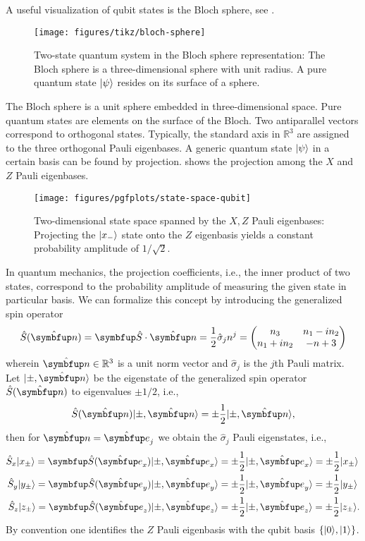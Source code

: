 A useful visualization of qubit states is the Bloch sphere, see .
\begin{figure}[htb]
	\centering
	\texttt{[image: figures/tikz/bloch-sphere]}
	\caption{Two-state quantum system in the Bloch sphere representation: The Bloch sphere is a three-dimensional sphere with unit radius. A pure quantum state  $\lvert\psi\rangle$ resides on its surface of a sphere.}\label{fig:bloch_sphere}
\end{figure}
The Bloch sphere is a unit sphere embedded in three-dimensional space.
Pure quantum states are elements on the surface of the Bloch.
Two antiparallel vectors correspond to orthogonal states.
Typically, the standard axis in $\mathbb{R}^3$ are assigned to the three orthogonal Pauli eigenbases.
A generic quantum state $\lvert\psi\rangle$ in a certain basis can be found by projection.
 shows the projection among the $X$ and $Z$ Pauli eigenbases.
\begin{figure}[htb]
	\centering
	\texttt{[image: figures/pgfplots/state-space-qubit]}
	\caption{Two-dimensional state space spanned by the $X,Z$ Pauli eigenbases: Projecting the $\lvert x_-\rangle$ state onto the $Z$ eigenbasis yields a constant probability amplitude of $1/\sqrt{2}$.}\label{fig:state_space_qubit}
\end{figure}
In quantum mechanics, the projection coefficients, i.e., the inner product of two states, correspond to the probability amplitude of measuring the given state in particular basis.
We can formalize this concept by introducing the generalized spin operator
\begin{equation}
	\hat{S}(\vu{n})
	=
	\vb{\hat{S}}\vdot\vu{n}
	=
	\frac{1}{2}
	\hat{\sigma}_jn^j
	=
	\begin{pmatrix}
		n_3 & n_1 - in_2 \\
		n_1 + in_2 & -n+3
	\end{pmatrix}
\end{equation}
wherein $\vu{n}\in\mathbb{R}^3$ is a unit norm vector and $\hat{\sigma}_j$ is the $j$th Pauli matrix.
Let $\ket{\pm,\vu{n}}$ be the eigenstate of the generalized spin operator $\hat{S}(\vu{n})$ to eigenvalues $\pm1/2$, i.e.,
\begin{equation}
	\hat{S}(\vu{n})
	\ket{\pm,\vu{n}}
	=
	\pm\frac{1}{2}
	\ket{\pm,\vu{n}},
\end{equation}
then for $\vu{n}=\vu{e}_j$ we obtain the $\hat{\sigma}_j$ Pauli eigenstates, i.e.,
\begin{align}
	\hat{S}_x
	\ket{x_\pm}
	=	
	\vb{\hat{S}}(\vu{e}_x)
	\ket{\pm,\vu{e}_x}
	&=
	\pm\frac{1}{2}
	\ket{\pm,\vu{e}_x}
	=
	\pm\frac{1}{2}
	\ket{x_\pm}
	\\
	\hat{S}_y
	\ket{y_\pm}
	=	
	\vb{\hat{S}}(\vu{e}_y)
	\ket{\pm,\vu{e}_y}
	&=
	\pm\frac{1}{2}
	\ket{\pm,\vu{e}_y}
	=
	\pm\frac{1}{2}
	\ket{y_\pm}
	\\
	\hat{S}_z
	\ket{z_\pm}
	=	
	\vb{\hat{S}}(\vu{e}_z)
	\ket{\pm,\vu{e}_z}
	&=
	\pm\frac{1}{2}
	\ket{\pm,\vu{e}_z}
	=
	\pm\frac{1}{2}
	\ket{z_\pm}
	.
\end{align}
By convention one identifies the $Z$ Pauli eigenbasis with the qubit basis $\left\{\lvert0\rangle,\lvert1\rangle\right\}$.


